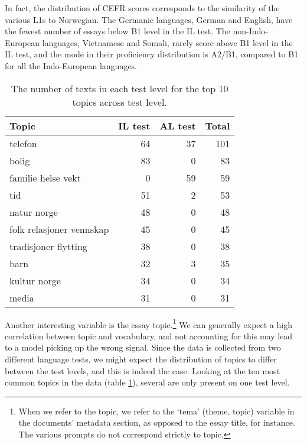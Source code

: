 In fact, the distribution of CEFR scores corresponds to the similarity of the
various \acp{L1} to Norwegian. The Germanic languages, German and English,
have the fewest number of essays below B1 level in the IL test. The
non-Indo-European languages, Vietnamese and Somali, rarely score above B1
level in the IL test, and the mode in their proficiency distribution is
A2/B1, compared to B1 for all the Indo-European languages.

\begin{table}
  \centering
  \begin{tabular}{lrrr}
    \toprule
    Topic                    & IL test & AL test & Total \\
    \midrule
    telefon                  &      64 &      37 &   101 \\
    bolig                    &      83 &       0 &    83 \\
    familie helse vekt       &       0 &      59 &    59 \\
    tid                      &      51 &       2 &    53 \\
    natur norge              &      48 &       0 &    48 \\
    folk relasjoner vennskap &      45 &       0 &    45 \\
    tradisjoner flytting     &      38 &       0 &    38 \\
    barn                     &      32 &       3 &    35 \\
    kultur norge             &      34 &       0 &    34 \\
    media                    &      31 &       0 &    31 \\
    \bottomrule
  \end{tabular}
  \caption[Most common topics in ASK texts]{
    The number of texts in each test level for the top 10 topics
    across test level.
  }
  \label{tab:texts-per-topic}
\end{table}

Another interesting variable is the essay topic.\footnote{When we refer to
the topic, we refer to the `tema' (theme, topic) variable in the documents'
metadata section, as opposed to the essay title, for instance. The various
prompts do not correspond strictly to topic.} We can generally expect a high
correlation between topic and vocabulary, and not accounting for this may
lead to a model picking up the wrong signal. Since the data is collected from
two different language tests, we might expect the distribution of topics to
differ between the test levels, and this is indeed the case. Looking at the
ten most common topics in the data (table \ref{tab:texts-per-topic}), several
are only present on one test level.

